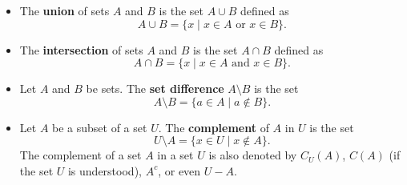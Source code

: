 \begin{itemize}
\item The \textbf{union} of sets $A$ and $B$ is the set $A \cup B$ defined as 
\[A \cup B = \{x \mid x \in A \text{ or } x \in B\}.\]
\item The \textbf{intersection} of sets $A$ and $B$ is the set $A \cap B$ defined as
\[A \cap B = \{x \mid x \in A \text{ and } x \in B\}.\]
\item Let $A$ and $B$ be sets. The \textbf{set difference} $A \setminus B$ is the set 
\[A \setminus B = \{a \in A \mid a \notin B\}.\]
\item Let $A$ be a subset of a set $U$. The \textbf{complement} of $A$ in $U$ is the set 
	\[U \setminus A = \{x \in U \mid x \notin A\}.\]
The complement of a set $A$ in a set $U$ is also denoted by $C_U(A)$, $C(A)$ (if the set $U$ is understood), $A^c$, or even $U-A$. 
\end{itemize}

